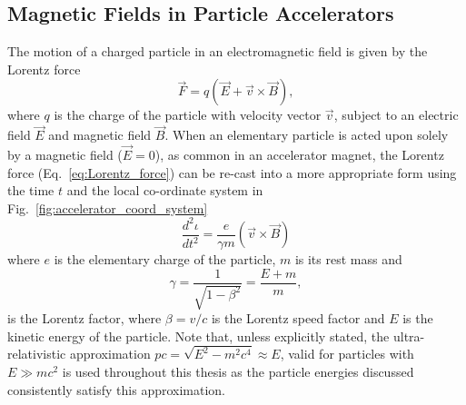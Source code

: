 \documentclass[../main.tex]{subfiles}
\begin{document}
\subsection{Magnetic Fields in Particle Accelerators}

The motion of a charged particle in an electromagnetic field is given by the Lorentz force 
\begin{equation}
\overrightarrow{F} = q\left(\overrightarrow{E}+\overrightarrow{v}\times\overrightarrow{B}\right),
\label{eq:Lorentz_force}    
\end{equation}
where $q$ is the charge of the particle with velocity vector $\overrightarrow{v}$, subject to an electric field $\overrightarrow{E}$ and magnetic field $\overrightarrow{B}$. When an elementary particle is acted upon solely by a magnetic field ($\overrightarrow{E}=0$), as common in an accelerator magnet, the Lorentz force (Eq.~\ref{eq:Lorentz_force}) can be re-cast into a more appropriate form using the time $t$ and the local  co-ordinate system in Fig.~\ref{fig:accelerator_coord_system}
\begin{equation}
\frac{d^{2}\iota}{dt^{2}} = \frac{e}{\gamma m}\left(\overrightarrow{v}\times\overrightarrow{B}\right)
\label{eq:displacement_Lorentz}    
\end{equation}
where $e$ is the elementary charge of the particle, $m$ is its rest mass and
\begin{equation}
\gamma = \frac{1}{\sqrt{1-\beta^{2}}} = \frac{E+m}{m},
\label{eq:Lorentz_factor}    
\end{equation}
is the Lorentz factor, where $\beta = v/c$ is the Lorentz speed factor and $E$ is the kinetic energy of the particle. Note that, unless explicitly stated, the ultra-relativistic approximation $pc = \sqrt{E^{2}-m^{2}c^{4}} \approx E$, valid for particles with $E \gg mc^{2}$ is used throughout this thesis as the particle energies discussed consistently satisfy this approximation.   
\end{document}
